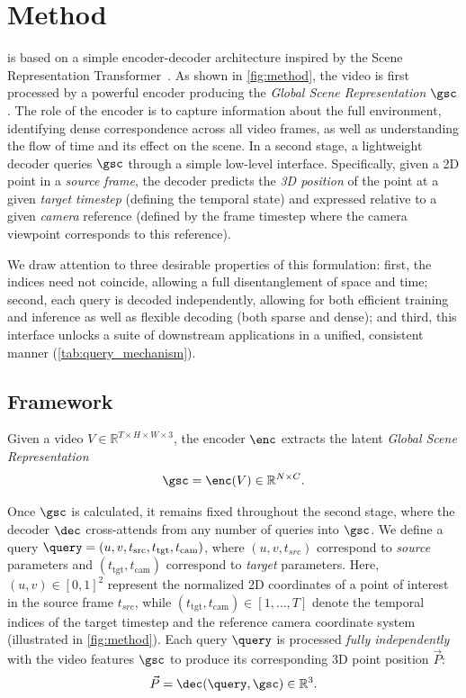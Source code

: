 \section{Method}
\label{sec:method}

\name is based on a simple encoder-decoder architecture inspired by the Scene Representation Transformer~\cite{srt, rust}.
As shown in \cref{fig:method}, the video is first processed by a powerful encoder producing the \emph{Global Scene Representation} $\gsc$.
The role of the encoder is to capture information about the full environment, identifying dense correspondence across all video frames, as well as understanding the flow of time and its effect on the scene.
In a second stage, a lightweight decoder queries $\gsc$ through a simple low-level interface.
Specifically, given a 2D point in a \emph{source frame}, the decoder predicts the \emph{3D position} of the point at a given \emph{target timestep} (defining the temporal state) and expressed relative to a given \emph{camera} reference (defined by the frame timestep where the camera viewpoint corresponds to this reference).


We draw attention to three desirable properties of this formulation:
first, the indices need not coincide, allowing a full disentanglement of space and time;
second, each query is decoded independently, allowing for both efficient training and inference as well as flexible decoding (both sparse and dense); and
third, this interface unlocks a suite of downstream applications in a unified, consistent manner (\cref{tab:query_mechanism}).

\subsection{\nameraw Framework}
\label{sec:method:framework}

Given a video $V \in \mathbb{R}^{T\times H\times W\times 3}$, the encoder $\enc$ extracts the latent \emph{Global Scene Representation}
\begin{equation*}
\gsc = \enc(V) \in \mathbb{R}^{N\times C}.
\end{equation*}

Once $\gsc$ is calculated, it remains fixed throughout the second stage, where the decoder $\dec$ cross-attends from any number of queries into $\gsc$.
We define a query $\query = (u, v, t_\text{src}, t_\text{tgt}, t_\text{cam})$, where $(u, v, t_{src})$ correspond to \emph{source} parameters and $(t_\text{tgt}, t_\text{cam})$ correspond to \emph{target} parameters.
Here, $(u, v) \in [0, 1]^2$ represent the normalized 2D coordinates of a point of interest in the source frame $t_{src}$, while $(t_\text{tgt}, t_\text{cam}) \in [1,\ldots, T]$ denote the temporal indices of the target timestep and the reference camera coordinate system (illustrated in \cref{fig:method}).
Each query $\query$ is processed \emph{fully independently} with the video features $\gsc$ to produce its corresponding 3D point position $\vec{P}$:
\begin{equation*}
\vec{P} = \dec(\query, \gsc) \in \mathbb{R}^3.
\end{equation*}




